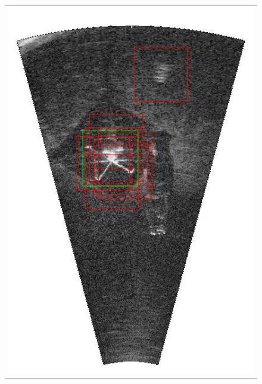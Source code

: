 \begin{figure}[p]
{\begin{tabular}[b]{c}
		\includegraphics[height=0.22\textheight]{chapters/images/proposals/detections/nms-070-2016-02-11_070611-frame16021-topK10-proposals.jpg}
        \end{tabular}
	}
	

\end{figure}
